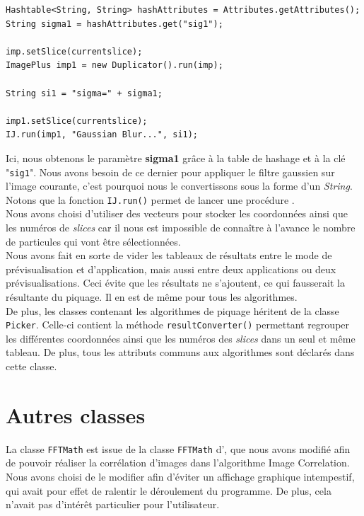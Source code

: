 \begin{center}
\begin{fmpage}{16cm}
\begin{small}
\begin{lstlisting}
Hashtable<String, String> hashAttributes = Attributes.getAttributes();
String sigma1 = hashAttributes.get("sig1");

imp.setSlice(currentslice);
ImagePlus imp1 = new Duplicator().run(imp);

String si1 = "sigma=" + sigma1;

imp1.setSlice(currentslice);
IJ.run(imp1, "Gaussian Blur...", si1);
\end{lstlisting}
\end{small}
\end{fmpage}
\end{center}

Ici, nous obtenons le paramètre \textbf{sigma1} grâce à la table de hashage et à la clé "\texttt{sig1}". Nous avons besoin de ce dernier pour appliquer le filtre gaussien sur l'image courante, c'est pourquoi nous le convertissons sous la forme d'un \emph{String}. Notons que la fonction \texttt{IJ.run()} permet de lancer une procédure \imj. \\

Nous avons choisi d'utiliser des vecteurs pour stocker les coordonnées ainsi que les numéros de \textit{slices} car il nous est impossible de connaître à l'avance le nombre de particules qui vont être sélectionnées. \\
Nous avons fait en sorte de vider les tableaux de résultats entre le mode de prévisualisation et d'application, mais aussi entre deux applications ou deux prévisualisations. Ceci évite que les résultats ne s'ajoutent, ce qui fausserait la résultante du piquage. Il en est de même pour tous les algorithmes. \\

De plus, les classes contenant les algorithmes de piquage héritent de la classe \texttt{Picker}. Celle-ci contient la méthode \texttt{resultConverter()} permettant regrouper les différentes coordonnées ainsi que les numéros des \textit{slices} dans un seul et même tableau. De plus, tous les attributs communs aux algorithmes sont déclarés dans cette classe. 

\section{Autres classes}

La classe \texttt{FFTMath} est issue de la classe \texttt{FFTMath} d'\imj, que nous avons modifié afin de pouvoir réaliser la corrélation d'images dans l'algorithme Image Correlation. Nous avons choisi de le modifier afin d'éviter un affichage graphique intempestif, qui avait pour effet de ralentir le déroulement du programme. De plus, cela n'avait pas d'intérêt particulier pour l'utilisateur. \\

